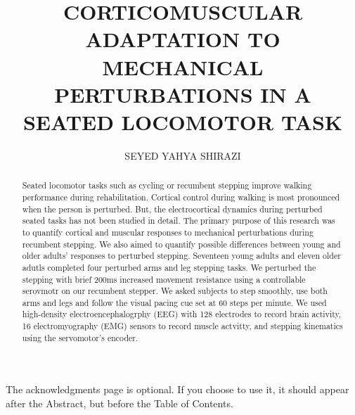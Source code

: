 \documentclass{UCF_ETD}
\title{\uppercase{Corticomuscular adaptation to mechanical perturbations in a seated locomotor task}} %
\author{\uppercase{Seyed Yahya Shirazi}} %
\begin{document}
\frontmatter

\maketitle


\begin{abstract}
Seated locomotor tasks such as cycling or recumbent stepping improve walking performance during rehabilitation. Cortical control during walking is most pronounced when the person is perturbed. But, the electrocortical dynamics during perturbed seated tasks has not been studied in detail. The primary purpose of this research was to quantify cortical and muscular responses to mechanical perturbations during recumbent stepping. We also aimed to quantify possible differences between young and older adults' responses to perturbed stepping. Seventeen young adults and eleven older adutls completed four perturbed arms and leg stepping tasks. We perturbed the stepping with brief 200ms increased movement resistance using a controllable serovmotr on our recumbent stepper. We asked subjects to step smoothly, use both arms and legs and follow the visual pacing cue set at 60 steps per minute. We used high-density electroencephalogrphy (EEG) with 128 electrodes to record brain activity, 16 electromyography (EMG) sensors to record muscle actvitty, and stepping kinematics using the servomotor's encoder. 
\end{abstract}

\dedication{Dedicated to my love, Maryam.}

\begin{acknowledgments}
The acknowledgments page is optional. If you choose to use it, it should appear after the Abstract, but before the Table of Contents.
\end{acknowledgments}

\tableofcontents

\listoffigures

\listoftables
\end{document}
